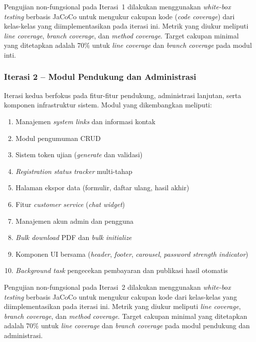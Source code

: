 Pengujian non-fungsional pada Iterasi~1 dilakukan menggunakan \textit{white-box testing} berbasis JaCoCo untuk mengukur cakupan kode (\textit{code coverage}) dari kelas-kelas yang diimplementasikan pada iterasi ini. Metrik yang diukur meliputi \textit{line coverage}, \textit{branch coverage}, dan \textit{method coverage}. Target cakupan minimal yang ditetapkan adalah 70\% untuk \textit{line coverage} dan \textit{branch coverage} pada modul inti.\par

\subsubsection{Iterasi 2 -- Modul Pendukung dan Administrasi}
Iterasi kedua berfokus pada fitur-fitur pendukung, administrasi lanjutan, serta komponen infrastruktur sistem. Modul yang dikembangkan meliputi:\par
\begin{enumerate}[noitemsep]
	\item Manajemen \textit{system links} dan informasi kontak
	\item Modul pengumuman CRUD
	\item Sistem token ujian (\textit{generate} dan validasi)
	\item \textit{Registration status tracker} multi-tahap
	\item Halaman ekspor data (formulir, daftar ulang, hasil akhir)
	\item Fitur \textit{customer service} (\textit{chat widget})
	\item Manajemen akun admin dan pengguna
	\item \textit{Bulk download} PDF dan \textit{bulk initialize}
	\item Komponen UI bersama (\textit{header}, \textit{footer}, \textit{carousel}, \textit{password strength indicator})
	\item \textit{Background task} pengecekan pembayaran dan publikasi hasil otomatis
\end{enumerate}

Pengujian non-fungsional pada Iterasi~2 dilakukan menggunakan \textit{white-box testing} berbasis JaCoCo untuk mengukur cakupan kode dari kelas-kelas yang diimplementasikan pada iterasi ini. Metrik yang diukur meliputi \textit{line coverage}, \textit{branch coverage}, dan \textit{method coverage}. Target cakupan minimal yang ditetapkan adalah 70\% untuk \textit{line coverage} dan \textit{branch coverage} pada modul pendukung dan administrasi.\par

